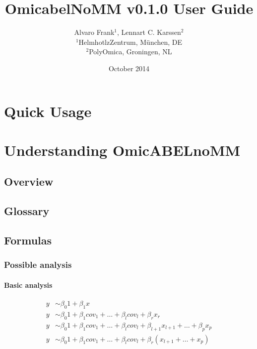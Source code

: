 \documentclass{report}
\newcommand{\oanomm}{OmicABELnoMM}
\begin{document}
\title{OmicabelNoMM v0.1.0 User Guide}
\author{Alvaro Frank$^1$, Lennart C. Karssen$^2$\\
  $^{1}${\small HelmhotlzZentrum, München, DE}\\
  $^{2}${\small PolyOmica, Groningen, NL} \\
}
\date{October 2014}
\maketitle
\tableofcontents


\chapter{Quick Usage}


\chapter{Understanding \oanomm}

\section{Overview}

\section{Glossary}

\section{Formulas}

\subsection{Possible analysis}

\subsubsection{Basic analysis}
\begin{align}
y &\sim \beta_0 1 + \beta_1 x \\
y &\sim \beta_0 1 + \beta_1 cov_1 + \dots + \beta_l cov_l + \beta_r x_r\\
y &\sim \beta_0 1 + \beta_1 cov_1 + \dots + \beta_l cov_l + \beta_{l+1} x_{l+1}  + \dots + \beta_p x_p\\
y &\sim \beta_0 1 + \beta_1 cov_1 + \dots + \beta_l cov_l + \beta_{r} \left(x_{l+1}  + \dots +  x_p\right)
\end{align}
\end{document}

